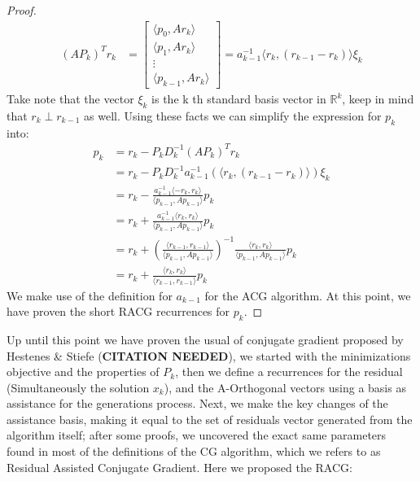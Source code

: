 \documentclass[]{article}
\theoremstyle{definition}
\begin{document}
\begin{proof}
                \begin{align}
                    (AP_k)^Tr_k &= 
                    \begin{bmatrix}
                        \langle p_0, Ar_k\rangle
                        \\
                        \langle p_1, Ar_k\rangle
                        \\
                        \vdots
                        \\
                        \langle p_{k - 1}, Ar_k\rangle
                    \end{bmatrix}
                    = 
                    a_{k - 1}^{-1}\langle r_k, (r_{k - 1} - r_{k})\rangle \xi_k
                \end{align}
                Take note that the vector $\xi_k$ is the k th standard basis vector in $\mathbb{R}^k$, keep in mind that $r_k\perp r_{k - 1}$ as well. Using these facts we can simplify the expression for $p_k$ into: 
                \begin{align}
                    p_k &= r_k - P_kD^{-1}_k(AP_k)^Tr_k
                    \\
                    &= r_k - P_kD_k^{-1}a_{k - 1}^{-1}(\langle r_k, (r_{k - 1} - r_{k})\rangle) \xi_k
                    \\
                    &= 
                    r_k - \frac{a_{k -1}^{-1}\langle -r_k, r_k\rangle}
                    {\langle p_{k - 1}, Ap_{k - 1}\rangle}p_k
                    \\
                    &= r_k + \frac{a_{k -1}^{-1}\langle r_k, r_k\rangle}
                    {\langle p_{k - 1}, Ap_{k - 1}\rangle}p_k
                    \\
                    &= r_k + 
                    \left(
                        \frac{\langle r_{k - 1}, r_{k - 1}\rangle}{\langle p_{k - 1}, Ap_{k - 1}\rangle}
                    \right)^{-1}
                    \frac{\langle r_k, r_k\rangle}{\langle p_{k - 1}, Ap_{k - 1}\rangle}p_k
                    \\
                    &= 
                    r_k + \frac{\langle r_k, r_k\rangle}{\langle r_{k - 1}, r_{k - 1}\rangle}p_k
                \end{align}
                We make use of the definition for $a_{k-1}$ for the ACG algorithm. At this point, we have proven the short RACG recurrences for $p_k$. 
            \end{proof}
            Up until this point we have proven the usual of conjugate gradient proposed by Hestenes \& Stiefe (\textbf{CITATION NEEDED}), we started with the minimizations objective and the properties of $P_k$, then we define a recurrences for the residual (Simultaneously the solution $x_k$), and the A-Orthogonal vectors using a basis as assistance for the generations process. Next, we make the key changes of the assistance basis, making it equal to the set of residuals vector generated from the algorithm itself; after some proofs, we uncovered the exact same parameters found in most of the definitions of the CG algorithm, which we refers to as Residual Assisted Conjugate Gradient. Here we proposed the RACG: 
\end{document}
